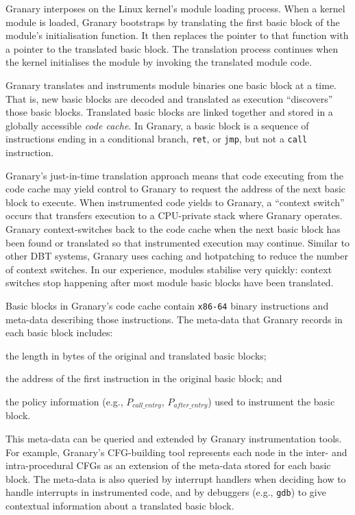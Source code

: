 \documentclass[preprint]{sigplanconf}
\begin{document}
Granary interposes on the Linux kernel's module loading process. When a kernel module is loaded, Granary bootstraps by translating the first basic block of the module's initialisation function.  It then replaces the pointer to that function with a pointer to the translated basic block. The translation process continues when the kernel initialises the module by invoking the translated module code.

Granary translates and instruments module binaries one basic block at a time. That is, new basic blocks are decoded and translated as execution ``discovers'' those basic blocks. Translated basic blocks are linked together and stored in a globally accessible \emph{code cache}. In Granary, a basic block is a sequence of instructions ending in a conditional branch, \texttt{ret}, or \texttt{jmp}, but not a \texttt{call} instruction.

Granary's just-in-time translation approach means that code executing from the code cache may yield control to Granary to request the address of the next basic block to execute. When instrumented code yields to Granary, a ``context switch'' occurs that transfers execution to a CPU-private stack where Granary operates. Granary context-switches back to the code cache when the next basic block has been found or translated so that instrumented execution may continue. Similar to other DBT systems, Granary uses caching and hotpatching to reduce the number of context switches. In our experience, modules stabilise very quickly: context switches stop happening after most module basic blocks have been translated.

Basic blocks in Granary's code cache contain \texttt{x86-64} binary instructions and meta-data describing those instructions. The meta-data that Granary records in each basic block includes: \begin{inparaenum}[i)]
	\item the length in bytes of the original and translated basic blocks;
	\item the address of the first instruction in the original basic block; and
	\item the policy information (e.g., $P_{\mathit{call\_entry}}$, $P_{\mathit{after\_entry}}$) used to instrument the basic block.
\end{inparaenum} This meta-data can be queried and extended by Granary instrumentation tools. For example, Granary's CFG-building tool represents each node in the inter- and intra-procedural CFGs as an extension of the meta-data stored for each basic block. The meta-data is also queried by interrupt handlers when deciding how to handle interrupts in instrumented code, and by debuggers (e.g., \texttt{gdb}) to give contextual information about a translated basic block. 
\end{document}
